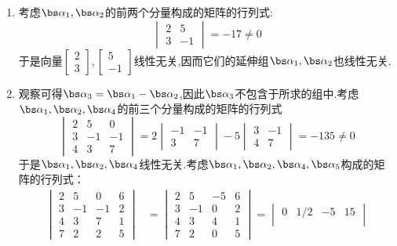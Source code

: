 \documentclass{ctexart}
\begin{document}
\begin{solution}
\begin{enumerate}[label=\tbf{(\arabic*)},topsep=0pt,parsep=0pt,itemsep=0pt,partopsep=0pt]
    \item 考虑$\bs\alpha_1,\bs\alpha_2$的前两个分量构成的矩阵的行列式:
    \[\begin{vmatrix}
        2&5\\3&-1
    \end{vmatrix}=-17\neq0\]
    于是向量$\begin{bmatrix}
        2\\3
    \end{bmatrix},\begin{bmatrix}
        5\\-1
    \end{bmatrix}$线性无关,因而它们的延伸组$\bs\alpha_1,\bs\alpha_2$也线性无关.
    \item 观察可得$\bs\alpha_3=\bs\alpha_1-\bs\alpha_2$,因此$\bs\alpha_3$不包含于所求的组中.考虑$\bs\alpha_1,\bs\alpha_2,\bs\alpha_4$的前三个分量构成的矩阵的行列式
    \[\begin{vmatrix}
        2&5&0\\
        3&-1&-1\\
        4&3&7
    \end{vmatrix}=2\begin{vmatrix}
        -1&-1\\3&7
    \end{vmatrix}-5\begin{vmatrix}
        3&-1\\4&7
    \end{vmatrix}=-135\neq0\]
    于是$\bs\alpha_1,\bs\alpha_2,\bs\alpha_4$线性无关.考虑$\bs\alpha_1,\bs\alpha_2,\bs\alpha_4,\bs\alpha_5$构成的矩阵的行列式：
    \[\begin{aligned}
        \begin{vmatrix}
        2&5&0&6\\
        3&-1&-1&2\\
        4&3&7&1\\
        7&2&2&5
    \end{vmatrix}
    &=\begin{vmatrix}
        2&5&-5&6\\
        3&-1&0&2\\
        4&3&4&1\\
        7&2&0&5
    \end{vmatrix}=\begin{vmatrix}
        0&1/2&-5&15\\

\end{vmatrix}
\end{aligned}\]
\end{enumerate}
\end{solution}
\end{document}
